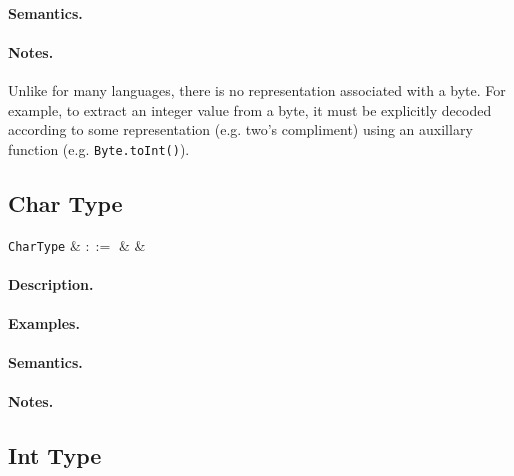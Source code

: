 \paragraph{Semantics.}

\paragraph{Notes.}  Unlike for many languages, there is no
representation associated with a byte. For example, to extract an
integer value from a byte, it must be explicitly decoded according to
some representation (e.g. two's compliment) using an auxillary function (e.g. \lstinline{Byte.toInt()}).



\subsection{Char Type}

\begin{syntax}
  \verb+CharType+ & $::=$ &  & \\
\end{syntax}

\paragraph{Description.}

\paragraph{Examples.}

\paragraph{Semantics.}

\paragraph{Notes.} 


\subsection{Int Type}

